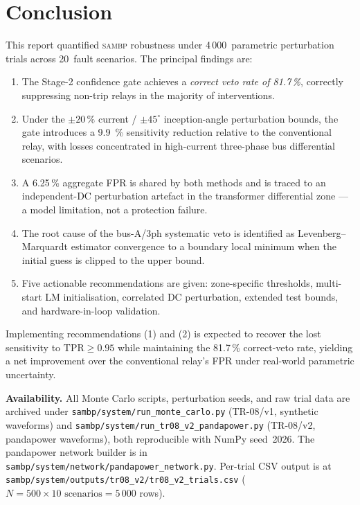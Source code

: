 \documentclass[12pt,a4paper]{article}
\newcommand{\SAMBP}{\textsc{sambp}}
\begin{document}
\section{Conclusion}

This report quantified \SAMBP{} robustness under 4\,000~parametric
perturbation trials across 20~fault scenarios.  The principal findings
are:

\begin{enumerate}
  \item The Stage-2 confidence gate achieves a \emph{correct veto rate
    of 81.7\,\%}, correctly suppressing non-trip relays in the majority
    of interventions.

  \item Under the $\pm20\,\%$ current / $\pm45^\circ$ inception-angle
    perturbation bounds, the gate introduces a \SI{9.9}{\percent}
    sensitivity reduction relative to the conventional relay, with losses
    concentrated in high-current three-phase bus differential scenarios.

  \item A 6.25\,\% aggregate FPR is shared by both methods and is traced
    to an independent-DC perturbation artefact in the transformer
    differential zone — a model limitation, not a protection failure.

  \item The root cause of the bus-A/3ph systematic veto is identified as
    Levenberg--Marquardt estimator convergence to a boundary local
    minimum when the initial guess is clipped to the upper bound.

  \item Five actionable recommendations are given: zone-specific
    thresholds, multi-start LM initialisation, correlated DC
    perturbation, extended test bounds, and hardware-in-loop
    validation.
\end{enumerate}

Implementing recommendations (1) and (2) is expected to recover the
lost sensitivity to $\mathrm{TPR} \ge 0.95$ while maintaining the
81.7\,\% correct-veto rate, yielding a net improvement over the
conventional relay's FPR under real-world parametric uncertainty.

\bigskip
\noindent\textbf{Availability.}
All Monte Carlo scripts, perturbation seeds, and raw trial data are
archived under \texttt{sambp/system/run\_monte\_carlo.py} (TR-08/v1,
synthetic waveforms) and \texttt{sambp/system/run\_tr08\_v2\_pandapower.py}
(TR-08/v2, pandapower waveforms), both reproducible with NumPy seed~2026.
The pandapower network builder is in
\texttt{sambp/system/network/pandapower\_network.py}.
Per-trial CSV output is at
\texttt{sambp/system/outputs/tr08\_v2/tr08\_v2\_trials.csv}
($N=500\times10\text{ scenarios}=5\,000$ rows).

\newpage


\end{document}
